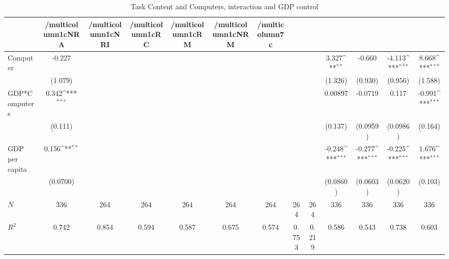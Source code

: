 \begin{table}[htbp]\centering
\def\sym#1{\ifmmode^{#1}\else\(^{#1}\)\fi}
\caption{Task Content and Computers, interaction and GDP control }
\begin{tabular}{l*{12}{c}}
\hline\hline
            &/multicolumn{1}{c}{NRA}&/multicolumn{1}{c}{NRI}&/multicolumn{1}{c}{RC}&/multicolumn{1}{c}{RM}&/multicolumn{1}{c}{NRM}&/multicolumn{7}{c}{}                                                                                                                                     \\
\hline
Computer    &      -0.227         &                     &                     &                     &                     &                     &                     &                     &       3.327\sym{**} &      -0.660         &      -4.113\sym{***}&       8.668\sym{***}\\
            &     (1.079)         &                     &                     &                     &                     &                     &                     &                     &     (1.326)         &     (0.930)         &     (0.956)         &     (1.588)         \\
[1em]
GDP*Computers&       0.342\sym{***}&                     &                     &                     &                     &                     &                     &                     &     0.00897         &     -0.0719         &       0.117         &      -0.991\sym{***}\\
            &     (0.111)         &                     &                     &                     &                     &                     &                     &                     &     (0.137)         &    (0.0959)         &    (0.0986)         &     (0.164)         \\
[1em]
GDP per capita&       0.156\sym{**} &                     &                     &                     &                     &                     &                     &                     &      -0.248\sym{***}&      -0.277\sym{***}&      -0.225\sym{***}&       1.676\sym{***}\\
            &    (0.0700)         &                     &                     &                     &                     &                     &                     &                     &    (0.0860)         &    (0.0603)         &    (0.0620)         &     (0.103)         \\
\hline
\(N\)       &         336         &         264         &         264         &         264         &         264         &         264         &         264         &         264         &         336         &         336         &         336         &         336         \\
\(R^{2}\)   &       0.742         &       0.854         &       0.594         &       0.587         &       0.675         &       0.574         &       0.753         &       0.219         &       0.586         &       0.543         &       0.738         &       0.603         \\
\hline\hline
\end{tabular}
\end{table}
